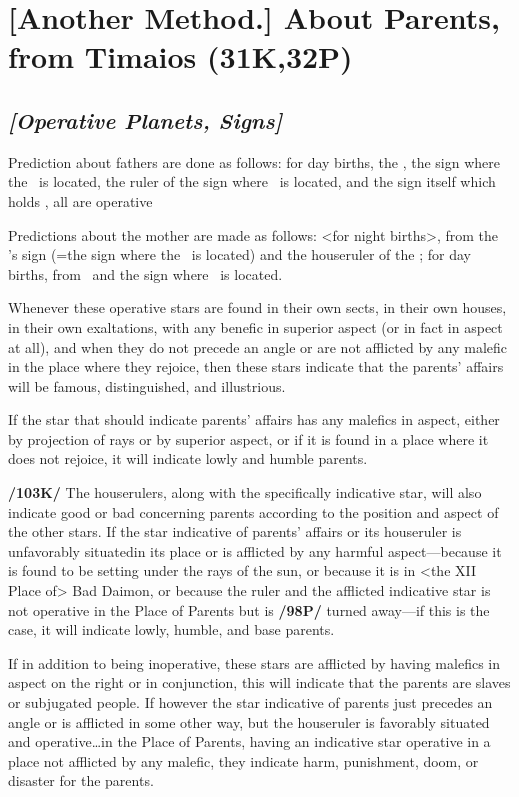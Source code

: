 \section{[Another Method.] About Parents, from Timaios (31K,32P)}

\subsection{\textit{[Operative Planets, Signs]}}
Prediction about fathers are done as follows: for day births, the \Sun, the sign where the \Sun\, is located, the ruler of the sign where \Jupiter\, is located, and the sign itself which holds \Jupiter, all are operative

Predictions about the mother are made as follows: <for night births>, from the \Moon’s sign (=the sign where the \Moon\, is located) and the houseruler of the \Moon; for day births, from \Venus\, and the sign where \Venus\, is located. 

Whenever these operative stars are found in their own sects, in their own houses, in their own exaltations, with any benefic in superior aspect (or in fact in aspect at all), and when they do not precede an angle or are not afflicted by any malefic in the place where they rejoice, then these stars indicate that the parents’ affairs will be famous, distinguished, and illustrious. 

If the star that should indicate parents’ affairs has any malefics in aspect, either by projection of rays or by superior aspect, or if it is found in a place where it does not rejoice, it will indicate lowly and humble parents.

\textbf{/103K/} The houserulers, along with the specifically indicative star, will also indicate good or bad concerning parents according to the position and aspect of the other stars. If the star indicative of parents’ affairs or its houseruler is unfavorably situated\mndl in its place or is afflicted by any harmful aspect—because it is found to be setting under the rays of the sun, or because it is in <the XII Place of> Bad Daimon, or because the ruler and the afflicted indicative star is not operative in the Place of Parents but is \textbf{/98P/} turned away—if this is the case, it will indicate lowly, humble, and base parents. 

If in addition to being inoperative, these stars are afflicted by having malefics in aspect on the right or in conjunction, this will indicate that the parents are slaves or subjugated people. If however the star indicative of parents just precedes an angle or is afflicted in some other way, but the houseruler is favorably situated and operative\ldots in the Place of Parents, having an indicative star operative in a place not afflicted by any malefic, they indicate harm, punishment, doom, or disaster for the parents. 

